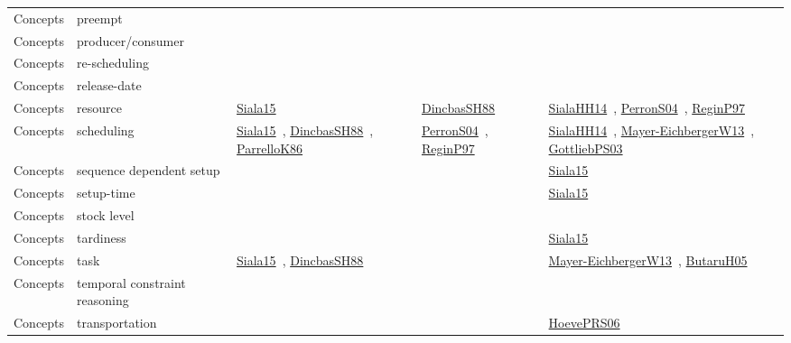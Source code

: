 {\begin{longtable}{lp{3cm}>{\raggedright\arraybackslash}p{6cm}>{\raggedright\arraybackslash}p{6cm}>{\raggedright\arraybackslash}p{8cm}}
Concepts & preempt &  &  & \\
Concepts & producer/consumer &  &  & \\
Concepts & re-scheduling &  &  & \\
Concepts & release-date &  &  & \\
Concepts & resource & \href{cars/works/Siala15.pdf}{Siala15}~\cite{Siala15} & \href{cars/works/DincbasSH88.pdf}{DincbasSH88}~\cite{DincbasSH88} & \href{cars/works/SialaHH14.pdf}{SialaHH14}~\cite{SialaHH14}, \href{cars/works/PerronS04.pdf}{PerronS04}~\cite{PerronS04}, \href{cars/works/ReginP97.pdf}{ReginP97}~\cite{ReginP97}\\
Concepts & scheduling & \href{cars/works/Siala15.pdf}{Siala15}~\cite{Siala15}, \href{cars/works/DincbasSH88.pdf}{DincbasSH88}~\cite{DincbasSH88}, \href{cars/works/ParrelloK86.pdf}{ParrelloK86}~\cite{ParrelloK86} & \href{cars/works/PerronS04.pdf}{PerronS04}~\cite{PerronS04}, \href{cars/works/ReginP97.pdf}{ReginP97}~\cite{ReginP97} & \href{cars/works/SialaHH14.pdf}{SialaHH14}~\cite{SialaHH14}, \href{cars/works/Mayer-EichbergerW13.pdf}{Mayer-EichbergerW13}~\cite{Mayer-EichbergerW13}, \href{cars/works/GottliebPS03.pdf}{GottliebPS03}~\cite{GottliebPS03}\\
Concepts & sequence dependent setup &  &  & \href{cars/works/Siala15.pdf}{Siala15}~\cite{Siala15}\\
Concepts & setup-time &  &  & \href{cars/works/Siala15.pdf}{Siala15}~\cite{Siala15}\\
Concepts & stock level &  &  & \\
Concepts & tardiness &  &  & \href{cars/works/Siala15.pdf}{Siala15}~\cite{Siala15}\\
Concepts & task & \href{cars/works/Siala15.pdf}{Siala15}~\cite{Siala15}, \href{cars/works/DincbasSH88.pdf}{DincbasSH88}~\cite{DincbasSH88} &  & \href{cars/works/Mayer-EichbergerW13.pdf}{Mayer-EichbergerW13}~\cite{Mayer-EichbergerW13}, \href{cars/works/ButaruH05.pdf}{ButaruH05}~\cite{ButaruH05}\\
Concepts & temporal constraint reasoning &  &  & \\
Concepts & transportation &  &  & \href{cars/works/HoevePRS06.pdf}{HoevePRS06}~\cite{HoevePRS06}\\
\end{longtable}
}

